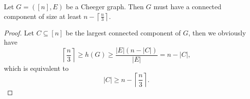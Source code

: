 \begin{prop}
Let \(G=([n],E)\) be a Cheeger graph. Then \(G\) must have a connected component of size at least \(n-\left\lceil\frac{n}{3}\right\rceil\).
\begin{proof}
Let \(C\subseteq [n]\) be the largest connected component of \(G\), then we obviously have
\[
\left\lceil\frac{n}{3}\right\rceil\geq h(G)\geq \frac{|E|(n-|C|)}{|E|}=n-|C|,
\]
which is equivalent to
\[
|C|\geq n-\left\lceil\frac{n}{3}\right\rceil.
\]
\end{proof}
\end{prop}

